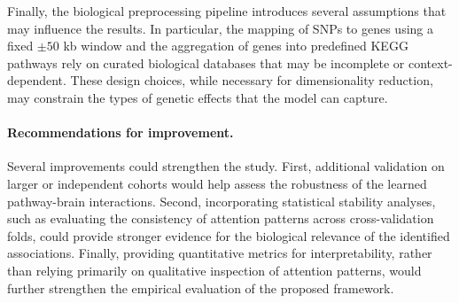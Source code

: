 Finally, the biological preprocessing pipeline introduces several assumptions that may influence the results. In particular, the mapping of SNPs to genes using a fixed $\pm50$ kb window and the aggregation of genes into predefined KEGG pathways rely on curated biological databases that may be incomplete or context-dependent. These design choices, while necessary for dimensionality reduction, may constrain the types of genetic effects that the model can capture.

\paragraph{Recommendations for improvement.}
Several improvements could strengthen the study. First, additional validation on larger or independent cohorts would help assess the robustness of the learned pathway-brain interactions. Second, incorporating statistical stability analyses, such as evaluating the consistency of attention patterns across cross-validation folds, could provide stronger evidence for the biological relevance of the identified associations. Finally, providing quantitative metrics for interpretability, rather than relying primarily on qualitative inspection of attention patterns, would further strengthen the empirical evaluation of the proposed framework.